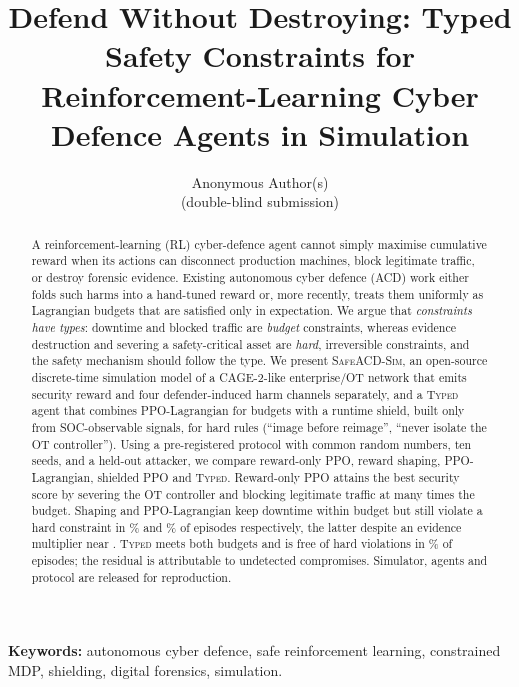 \documentclass[10pt]{article}
\title{Defend Without Destroying: Typed Safety Constraints for\\
Reinforcement-Learning Cyber Defence Agents in Simulation}
\author{Anonymous Author(s)\\ \small (double-blind submission)}
\date{}
\newcommand{\safeacd}{\textsc{SafeACD-Sim}}
\newcommand{\typed}{\textsc{Typed}}
\begin{document}
\maketitle

\begin{abstract}
A reinforcement-learning (RL) cyber-defence agent cannot simply maximise
cumulative reward when its actions can disconnect production machines, block
legitimate traffic, or destroy forensic evidence. Existing autonomous cyber
defence (ACD) work either folds such harms into a hand-tuned reward or, more
recently, treats them uniformly as Lagrangian budgets that are satisfied only
in expectation. We argue that \emph{constraints have types}: downtime and
blocked traffic are \emph{budget} constraints, whereas evidence destruction and
severing a safety-critical asset are \emph{hard}, irreversible constraints, and
the safety mechanism should follow the type. We present \safeacd{}, an
open-source discrete-time simulation model of a CAGE-2-like enterprise/OT
network that emits security reward and four defender-induced harm channels
separately, and a \typed{} agent that combines PPO-Lagrangian for budgets with
a runtime shield, built only from SOC-observable signals, for hard rules
(``image before reimage'', ``never isolate the OT controller''). Using a
pre-registered protocol with common random numbers, ten seeds, and a held-out
attacker, we compare reward-only PPO, reward shaping, PPO-Lagrangian, shielded
PPO and \typed{}. Reward-only PPO attains the best security score by
severing the OT controller and blocking legitimate traffic at many times the
budget. Shaping and PPO-Lagrangian keep downtime within budget but still
violate a hard constraint in \resTrainShapedHardFreePctViol\% and
\resTrainLagHardFreePctViol\% of episodes respectively, the latter despite an
evidence multiplier near \lamFinalLagEvidence. \typed{}
meets both budgets and is free of hard violations in \resTrainTypedHardFreePct\% of
episodes; the residual is attributable to undetected compromises.
Simulator, agents and protocol are released for reproduction.
\end{abstract}

\noindent\textbf{Keywords:} autonomous cyber defence, safe reinforcement
learning, constrained MDP, shielding, digital forensics, simulation.

\end{document}
